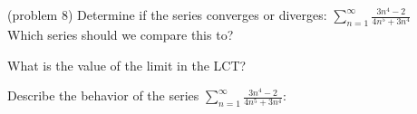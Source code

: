 \documentclass[handout]{ximera}
\begin{document}
\begin{problem}(problem 8)
Determine if the series converges or diverges: $\displaystyle{\sum_{n=1}^\infty \frac{3n^4 -2}{4n^5 + 3n^4}}$\\
Which series should we compare this to?

\begin{multipleChoice}
\end{multipleChoice}

What is the value of the limit in the LCT?
\begin{multipleChoice}
\end{multipleChoice}

Describe the behavior of the series $\displaystyle{\sum_{n=1}^\infty \frac{3n^4 -2}{4n^5 + 3n^4}:}$
\begin{multipleChoice}
\end{multipleChoice}

\end{problem}
\end{document}
